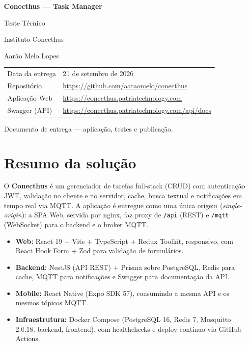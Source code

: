 \documentclass[11pt,a4paper]{article}
\begin{document}
\begin{titlepage}
  \centering
  {\LARGE\bfseries Conecthus --- Task Manager\par}
  \vspace{1.2cm}
  {\large Teste Técnico\par}
  \vspace{0.3cm}
  {\large Instituto Conecthus\par}
  \vspace{1.5cm}
  {\large Aarão Melo Lopes\par}
  \vspace{4cm}

  \begin{tabular}{@{}ll@{}}
    \toprule
    Data da entrega & 21 de setembro de 2026 \\[3pt]
    Repositório & \url{https://github.com/aaraomelo/conecthus} \\[3pt]
    Aplicação Web & \url{https://conecthus.patriatechnology.com} \\[3pt]
    Swagger (API) & \url{https://conecthus.patriatechnology.com/api/docs} \\
    \bottomrule
  \end{tabular}

  \vfill
  {\footnotesize Documento de entrega --- aplicação, testes e publicação.}
\end{titlepage}

\section{Resumo da solução}

O \textbf{Conecthus} é um gerenciador de tarefas full-stack (CRUD) com autenticação
JWT, validação no cliente e no servidor, cache, busca textual e notificações em
tempo real via MQTT. A aplicação é entregue como uma única origem (\emph{single-origin}):
a SPA Web, servida por nginx, faz proxy de \texttt{/api} (REST) e \texttt{/mqtt}
(WebSocket) para o backend e o broker MQTT.

\begin{itemize}[leftmargin=1.4em,itemsep=2pt]
  \item \textbf{Web:} React 19 + Vite + TypeScript + Redux Toolkit, responsivo, com
        React Hook Form + Zod para validação de formulários.
  \item \textbf{Backend:} NestJS (API REST) + Prisma sobre PostgreSQL, Redis para cache,
        MQTT para notificações e Swagger para documentação da API.
  \item \textbf{Mobile:} React Native (Expo SDK 57), consumindo a mesma API e os
        mesmos tópicos MQTT.
  \item \textbf{Infraestrutura:} Docker Compose (PostgreSQL 16, Redis 7, Mosquitto 2.0.18,
        backend, frontend), com healthchecks e deploy contínuo via GitHub Actions.
\end{itemize}
\end{document}
